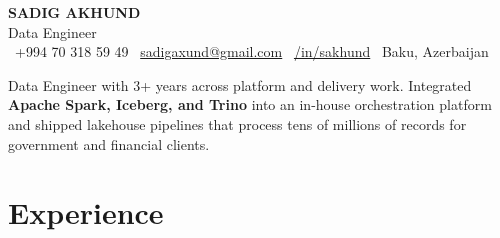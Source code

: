 \documentclass[letterpaper,10pt]{article}
\begin{document}
\begin{center}
    {\huge \textbf{\MakeUppercase{Sadig Akhund}}} \\[3pt]
    {\Large \color{accent} Data Engineer} \\[6pt]
    {\small
        \faPhone\ +994 70 318 59 49 \quad
        \faEnvelope\ \href{mailto:sadigaxund@gmail.com}{sadigaxund@gmail.com} \quad
        \faLinkedin\ \href{https://linkedin.com/in/sakhund}{/in/sakhund} \quad
        \faMapMarker*\ Baku, Azerbaijan
    }
\end{center}

\vspace{6pt}
{\small Data Engineer with 3+ years across platform and delivery work. Integrated \textbf{Apache Spark, Iceberg, and Trino} into an in-house orchestration platform and shipped lakehouse pipelines that process tens of millions of records for government and financial clients.\par}

\section{Experience}
\end{document}
